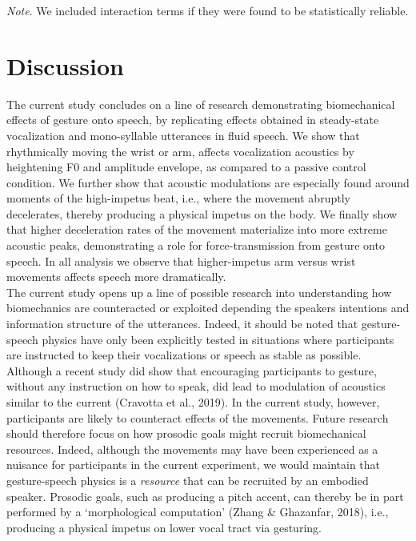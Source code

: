 \documentclass[
  man,floatsintext]{apa6}
\begin{document}
\emph{Note}. We included interaction terms if they were found to be statistically reliable.

\pagebreak

\hypertarget{discussion}{%
\section{Discussion}\label{discussion}}

The current study concludes on a line of research demonstrating biomechanical effects of gesture onto speech, by replicating effects obtained in steady-state vocalization and mono-syllable utterances in fluid speech. We show that rhythmically moving the wrist or arm, affects vocalization acoustics by heightening F0 and amplitude envelope, as compared to a passive control condition. We further show that acoustic modulations are especially found around moments of the high-impetus beat, i.e., where the movement abruptly decelerates, thereby producing a physical impetus on the body. We finally show that higher deceleration rates of the movement materialize into more extreme acoustic peaks, demonstrating a role for force-transmission from gesture onto speech. In all analysis we observe that higher-impetus arm versus wrist movements affects speech more dramatically.\\
The current study opens up a line of possible research into understanding how biomechanics are counteracted or exploited depending the speakers intentions and information structure of the utterances. Indeed, it should be noted that gesture-speech physics have only been explicitly tested in situations where participants are instructed to keep their vocalizations or speech as stable as possible. Although a recent study did show that encouraging participants to gesture, without any instruction on how to speak, did lead to modulation of acoustics similar to the current (Cravotta et al., 2019). In the current study, however, participants are likely to counteract effects of the movements. Future research should therefore focus on how prosodic goals might recruit biomechanical resources. Indeed, although the movements may have been experienced as a nuisance for participants in the current experiment, we would maintain that gesture-speech physics is a \emph{resource} that can be recruited by an embodied speaker. Prosodic goals, such as producing a pitch accent, can thereby be in part performed by a `morphological computation' (Zhang \& Ghazanfar, 2018), i.e., producing a physical impetus on lower vocal tract via gesturing.\\
\end{document}
